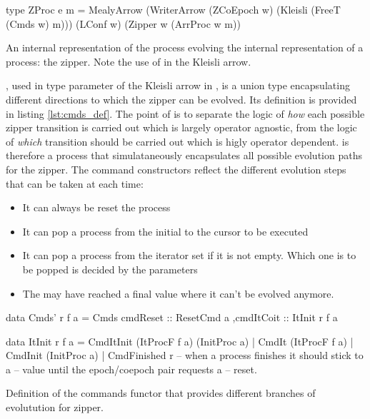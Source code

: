 \begin{code}
\begin{haskellcode}
type ZProc e m =
  MealyArrow
    (WriterArrow (ZCoEpoch w) (Kleisli (FreeT (Cmds w) m)))
    (LConf w)
    (Zipper w (ArrProc w m))
\end{haskellcode}
  \caption{\label{lst:zproc_def}An internal representation of the
    process evolving the internal representation of a process: the
    zipper. Note the use of  in the Kleisli arrow.}
\end{code}


, used in type parameter of the Kleisli arrow in
, is a union type encapsulating different directions to
which the zipper can be evolved. Its definition is provided in listing
\ref{lst:cmds_def}. The point of  is to separate the logic
of \emph{how} each possible zipper transition is carried out which is
largely operator agnostic, from the logic of \emph{which} transition
should be carried out which is higly operator dependent.  
is therefore a process that simulataneously encapsulates all possible
evolution paths for the zipper.  The command constructors reflect the
different evolution steps that can be taken at each time:

\begin{itemize}
\item It can always be reset the process
\item It can pop a process from the initial to the cursor to be executed
\item It can pop a process from the iterator set if it is not
  empty. Which one is to be popped is decided by the parameters
\item The may have reached a final value where it can't be evolved
  anymore.
\end{itemize}


\begin{code}
\begin{haskellcode}
data Cmds' r f a =
  Cmds { cmdReset :: ResetCmd a
        ,cmdItCoit :: ItInit r f a
       }

data ItInit r f a
  = CmdItInit (ItProcF f a) (InitProc a)
  | CmdIt (ItProcF f a)
  | CmdInit (InitProc a)
  | CmdFinished r -- when a process finishes it should stick to a
                  -- value until the epoch/coepoch pair requests a
                  -- reset.
\end{haskellcode}
  \caption{\label{lst:cmds_def}Definition of the commands functor that
    provides different branches of evolutution for zipper.}
\end{code}

